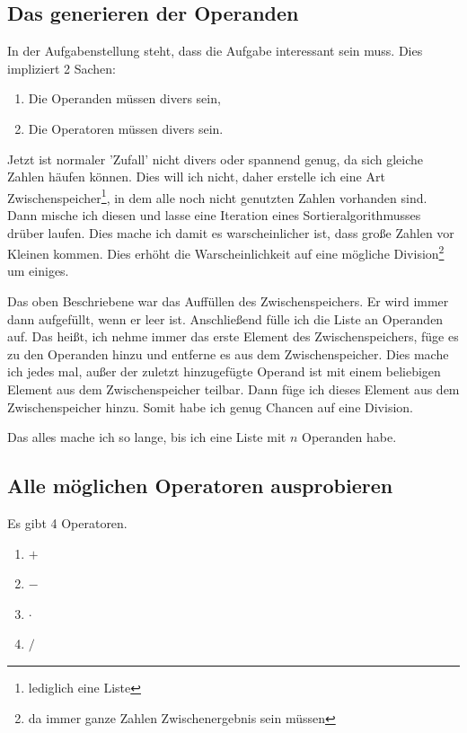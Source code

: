 \documentclass[a4paper,10pt,ngerman]{scrartcl}
\begin{document}
\subsection{Das generieren der Operanden}

In der Aufgabenstellung steht, dass die Aufgabe interessant sein muss. Dies impliziert 2 Sachen:

\begin{enumerate}
\item Die Operanden müssen divers sein,
\item Die Operatoren müssen divers sein.
\end{enumerate}

Jetzt ist normaler 'Zufall' nicht divers oder spannend genug, da sich gleiche Zahlen häufen können. Dies will ich nicht, daher erstelle ich eine Art Zwischenspeicher\footnote{lediglich eine Liste}, in dem alle noch nicht genutzten Zahlen vorhanden sind. Dann mische ich diesen und lasse eine Iteration eines Sortieralgorithmusses drüber laufen. Dies mache ich damit es warscheinlicher ist, dass große Zahlen vor Kleinen kommen. Dies erhöht die Warscheinlichkeit auf eine mögliche Division\footnote{da immer ganze Zahlen Zwischenergebnis sein müssen} um einiges.

Das oben Beschriebene war das Auffüllen des Zwischenspeichers. Er wird immer dann aufgefüllt, wenn er leer ist. Anschließend fülle ich die Liste an Operanden auf. Das heißt, ich nehme immer das erste Element des Zwischenspeichers, füge es zu den Operanden hinzu und entferne es aus dem Zwischenspeicher. Dies mache ich jedes mal, außer der zuletzt hinzugefügte Operand ist mit einem beliebigen Element aus dem Zwischenspeicher teilbar. Dann füge ich dieses Element aus dem Zwischenspeicher hinzu. Somit habe ich genug Chancen auf eine Division.

Das alles mache ich so lange, bis ich eine Liste mit $n$ Operanden habe.

\newpage
\subsection{Alle möglichen Operatoren ausprobieren}

Es gibt 4 Operatoren.

\begin{enumerate}
\item $+$
\item $-$
\item $\cdot$
\item $/$
\end{enumerate}
\end{document}
